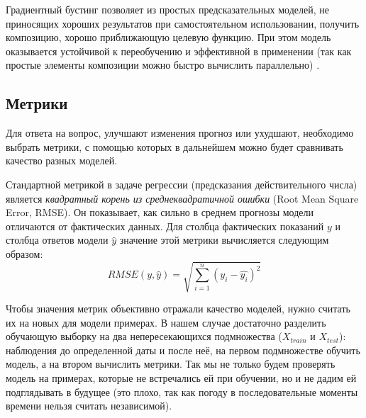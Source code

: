 \documentclass[14pt]{matmex-diploma}
\begin{document}
Градиентный бустинг позволяет из простых предсказательных моделей, не приносящих хороших результатов при самостоятельном использовании, получить композицию, хорошо приближающую целевую функцию. При этом модель оказывается устойчивой к переобучению и эффективной в применении (так как простые элементы композиции можно быстро вычислить параллельно) \cite{FRIEDMAN2002367}.





\subsection{Метрики}
Для ответа на вопрос, улучшают изменения прогноз или ухудшают, необходимо выбрать метрики, с помощью которых в дальнейшем можно будет сравнивать качество разных моделей.

Стандартной метрикой в задаче регрессии (предсказания действительного числа) является \textit{квадратный корень из среднеквадратичной ошибки} (Root Mean Square Error, RMSE). Он показывает, как сильно в среднем прогнозы модели отличаются от фактических данных. Для столбца фактических показаний $y$ и столбца ответов модели $\hat{y}$ значение этой метрики вычисляется следующим образом:
        $$RMSE(y, \hat{y}) = \sqrt{\sum^{n}_{i=1}{(y_i - \hat{y_i})^2}}$$


Чтобы значения метрик объективно отражали качество моделей, нужно считать их на новых для модели примерах. В нашем случае достаточно разделить обучающую выборку на два непересекающихся подмножества ($X_{train}$ и $X_{test}$): наблюдения до определенной даты и после неё, на первом подмножестве обучить модель, а на втором вычислить метрики. Так мы не только будем проверять модель на примерах, которые не встречались ей при обучении, но и не дадим ей подглядывать в будущее (это плохо, так как погоду в последовательные моменты времени нельзя считать независимой).  
\end{document}

